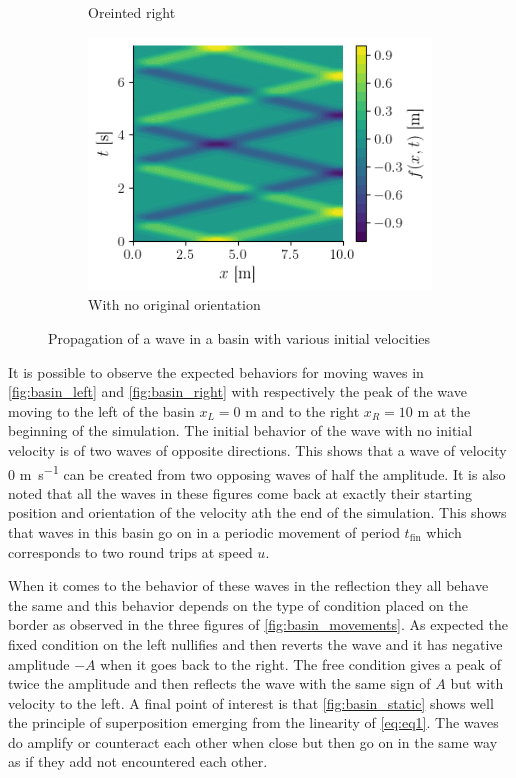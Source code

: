\begin{figure}[h]
\begin{subfigure}{0.48\linewidth}
        \caption{Oreinted right}
        \label{fig:basin_right}
    \end{subfigure}
    \begin{subfigure}{0.48\linewidth}
        \includegraphics[width=\linewidth]{figures/bassin_default_static.png}
        \caption{With no original orientation}
        \label{fig:basin_static}
    \end{subfigure}
    \caption{Propagation of a wave in a basin with various initial velocities}
    \label{fig:basin_movements}
\end{figure}

It is possible to observe the expected behaviors for moving waves in \autoref{fig:basin_left} and \autoref{fig:basin_right} with respectively the peak of the wave moving to the left of the basin $x_L = 0$ \si{\meter} and to the right $x_R = 10$ \si{\meter} at the beginning of the simulation. The initial behavior of the wave with no initial velocity is of two waves of opposite directions. This shows that a wave of velocity 0 \si{\meter\per\second} can be created from two opposing waves of half the amplitude. It is also noted that all the waves in these figures come back at exactly their starting position and orientation of the velocity ath the end of the simulation. This shows that waves in this basin go on in a periodic movement of period $t_\mathrm{fin}$ which corresponds to two round trips at speed $u$.

When it comes to the behavior of these waves in the reflection they all behave the same and this behavior depends on the type of condition placed on the border as observed in the three figures of \autoref{fig:basin_movements}. As expected the fixed condition on the left nullifies and then reverts the wave and it has negative amplitude $-A$ when it goes back to the right. The free condition gives a peak of twice the amplitude and then reflects the wave with the same sign of $A$ but with velocity to the left. A final point of interest is that \autoref{fig:basin_static} shows well the principle of superposition emerging from the linearity of \autoref{eq:eq1}. The waves do amplify or counteract each other when close but then go on in the same way as if they add not encountered each other.


